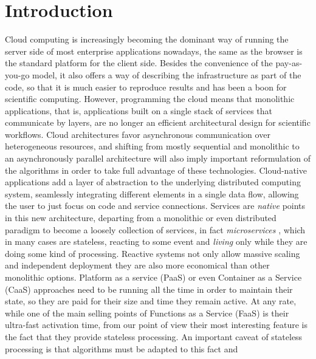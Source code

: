\documentclass{llncs}
\begin{document}
\section{Introduction}
Cloud computing is increasingly becoming the dominant way of running
the server side of most enterprise applications nowadays, the same as the browser is
the standard platform for the client side. Besides the convenience of the pay-as-you-go
model, it also offers a way of describing the infrastructure as part
of the code, so that it is much easier to reproduce results and has 
been a boon for scientific computing.
However,
programming the cloud means that monolithic applications, that is,
applications built on a single stack of services that communicate by
layers, are no longer an efficient architectural design for scientific workflows. Cloud
architectures favor asynchronous communication over heterogeneous %
resources, and shifting from mostly sequential and monolithic 
to an asynchronously parallel architecture will also imply important
reformulation of the algorithms in order to take full advantage of these technologies.
  Cloud-native applications add a layer of abstraction to the
  underlying distributed computing system, seamlessly integrating
  different elements in a single data flow, allowing the user to just focus on code and service connections. Services are {\em native} points
  in this new architecture, departing from a monolithic or even
  distributed paradigm to become a loosely collection of
services, in fact {\em microservices} \cite{microservices}, which in
 many cases are stateless, reacting to some event and
  {\em living} only while they are doing some kind of processing.
  Reactive systems not only allow massive scaling and independent deployment they are also more economical than other monolithic options.  Platform as a service (PaaS) or even Container as a Service (CaaS) approaches need to be running all
  the time in order to maintain their state, so they are paid for their size and
  time they remain active.
  At any rate, while one of the main selling points of Functions as a Service (FaaS) is their ultra-fast activation time, from our point of view their most interesting feature is the fact that they provide stateless processing. An important caveat
  of stateless processing is that algorithms must be adapted to this fact and
\end{document}
